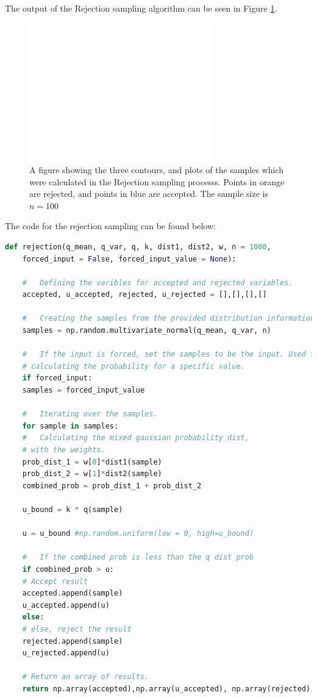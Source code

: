 \documentclass[a4paper, 11pt]{article}
\begin{document}
The output of the Rejection sampling algorithm can be seen in Figure \ref*{fig:rejectionsampling}.

\begin{figure}[h]
    \includegraphics[width=8cm]{fig/3dcontour.jpg}
    \caption{A figure showing the three contours, and plots of the samples which were calculated in the Rejection sampling processs. Points in orange are rejected, and points in blue are accepted. The sample size is $n=100$}
    \label{fig:rejectionsampling}
\end{figure}

The code for the rejection sampling can be found below:
\begin{lstlisting}[language=Python, caption=Python example]
def rejection(q_mean, q_var, q, k, dist1, dist2, w, n = 1000, 
    forced_input = False, forced_input_value = None):

    #   Defining the varibles for accepted and rejected variables.
    accepted, u_accepted, rejected, u_rejected = [],[],[],[] 

    #   Creating the samples from the provided distribution information.
    samples = np.random.multivariate_normal(q_mean, q_var, n)

    #   If the input is forced, set the samples to be the input. Used for 
    # calculating the probability for a specific value.
    if forced_input:
    samples = forced_input_value

    #   Iterating over the samples.
    for sample in samples:
    #   Calculating the mixed gaussian probability dist,
    # with the weights.
    prob_dist_1 = w[0]*dist1(sample)
    prob_dist_2 = w[1]*dist2(sample)
    combined_prob = prob_dist_1 + prob_dist_2

    u_bound = k * q(sample)

    u = u_bound #np.random.uniform(low = 0, high=u_bound)

    #   If the combined prob is less than the q dist prob
    if combined_prob > u:
    # Accept result
    accepted.append(sample)
    u_accepted.append(u)
    else:
    # else, reject the result
    rejected.append(sample)
    u_rejected.append(u)

    # Return an array of results.
    return np.array(accepted),np.array(u_accepted), np.array(rejected), np.array(u_rejected)
\end{lstlisting}
\end{document}
